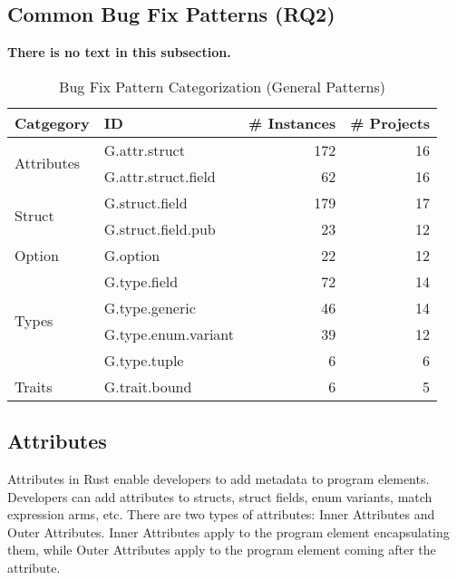 
\subsection{\label{sec:common_patterns}Common Bug Fix Patterns (RQ2)}

{\bf There is no text in this subsection.} 

\begin{table}[]

\begin{tabular}{l|l|r|r}
\textbf{Catgegory} & \textbf{ID} & \textbf{\# Instances} & \textbf{\# Projects} \\
\hline
\multirow{2}{*}{Attributes} & G.attr.struct & 172 & 16                                  \\
& G.attr.struct.field & 62 & 16                     \\\cline{1-4}
\multirow{2}{*}{Struct} & G.struct.field  & 179 & 17\\
& G.struct.field.pub & 23 & 12   
\\\cline{1-4}
Option & G.option & 22 & 12                    \\\cline{1-4}
\multirow{4}{*}{Types} & G.type.field  & 72 & 14 \\
& G.type.generic & 46 & 14\\ & G.type.enum.variant  & 39 & 12 \\
& G.type.tuple & 6 & 6                                         \\\cline{1-4}
\multirow{1}{*}{Traits} & G.trait.bound & 6 & 5 \\ 
\end{tabular}
\caption{\label{table:general}Bug Fix Pattern Categorization (General Patterns)}
\end{table}
    
    

\subsection{Attributes}

Attributes in Rust enable developers to add metadata to program elements. Developers can add attributes to structs, struct fields, enum variants, match expression arms, etc. There are two types of attributes: Inner Attributes and Outer Attributes. Inner Attributes apply to the program element encapsulating them, while Outer Attributes apply to the program element coming after the attribute. \\

